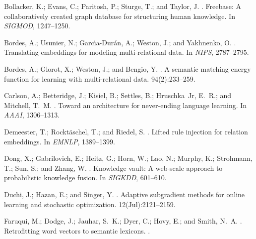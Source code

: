 \documentclass[letterpaper]{article} \usepackage{aaai18}  \usepackage{times}  \usepackage{helvet}  \usepackage{courier}  \usepackage{url}  \usepackage{graphicx}  \usepackage{amsmath}
\begin{document}
\begin{thebibliography}{}
\small
{}
Bollacker, K.; Evans, C.; Paritosh, P.; Sturge, T.; and Taylor, J.
.
\newblock Freebase: A collaboratively created graph database for structuring
  human knowledge.
\newblock In {\em SIGMOD},  1247--1250.

Bordes, A.; Usunier, N.; Garc{\'\i}a-Dur{\'a}n, A.; Weston, J.; and Yakhnenko,
  O.
.
\newblock Translating embeddings for modeling multi-relational data.
\newblock In {\em NIPS},  2787--2795.

Bordes, A.; Glorot, X.; Weston, J.; and Bengio, Y.
.
\newblock A semantic matching energy function for learning with
  multi-relational data.
 94(2):233--259.

Carlson, A.; Betteridge, J.; Kisiel, B.; Settles, B.; Hruschka~Jr, E.~R.; and
  Mitchell, T.~M.
.
\newblock Toward an architecture for never-ending language learning.
\newblock In {\em AAAI},  1306--1313.

Demeester, T.; Rockt\"{a}schel, T.; and Riedel, S.
.
\newblock Lifted rule injection for relation embeddings.
\newblock In {\em EMNLP},  1389--1399.

Dong, X.; Gabrilovich, E.; Heitz, G.; Horn, W.; Lao, N.; Murphy, K.; Strohmann,
  T.; Sun, S.; and Zhang, W.
.
\newblock Knowledge vault: A web-scale approach to probabilistic knowledge
  fusion.
\newblock In {\em SIGKDD},  601--610.

Duchi, J.; Hazan, E.; and Singer, Y.
.
\newblock Adaptive subgradient methods for online learning and stochastic
  optimization.
 12(Jul):2121--2159.

Faruqui, M.; Dodge, J.; Jauhar, S.~K.; Dyer, C.; Hovy, E.; and Smith, N.~A.
.
\newblock Retrofitting word vectors to semantic lexicons.
.


\end{thebibliography}
\end{document}
